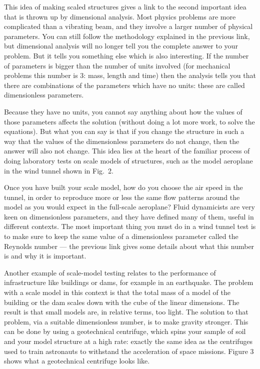   This idea of making scaled structures gives a link to the second important 
  idea that is thrown up by dimensional analysis. Most physics problems are 
  more complicated than a vibrating beam, and they involve a larger number of 
  physical parameters. You can still follow the methodology explained in the 
  previous link, but dimensional analysis will no longer tell you the complete 
  answer to your problem. But it tells you something else which is also 
  interesting. If the number of parameters is bigger than the number of units 
  involved (for mechanical problems this number is 3: mass, length and time) 
  then the analysis tells you that there are combinations of the parameters 
  which have no units: these are called dimensionless parameters. 

  Because they have no units, you cannot say anything about how the values of 
  those parameters affects the solution (without doing a lot more work, to 
  solve the equations). But what you can say is that if you change the 
  structure in such a way that the values of the dimensionless parameters do 
  not change, then the answer will also not change. This idea lies at the heart 
  of the familiar process of doing laboratory tests on scale models of 
  structures, such as the model aeroplane in the wind tunnel shown in Fig.\ 2. 


  Once you have built your scale model, how do you choose the air speed in the 
  tunnel, in order to reproduce more or less the same flow patterns around the 
  model as you would expect in the full-scale aeroplane? Fluid dynamicists are 
  very keen on dimensionless parameters, and they have defined many of them, 
  useful in different contexts. The most important thing you must do in a wind 
  tunnel test is to make sure to keep the same value of a dimensionless 
  parameter called the Reynolds number — the previous link gives some details 
  about what this number is and why it is important. 

  Another example of scale-model testing relates to the performance of 
  infrastructure like buildings or dams, for example in an earthquake. The 
  problem with a scale model in this context is that the total mass of a model 
  of the building or the dam scales down with the cube of the linear 
  dimensions. The result is that small models are, in relative terms, too 
  light. The solution to that problem, via a suitable dimensionless number, is 
  to make gravity stronger. This can be done by using a geotechnical 
  centrifuge, which spins your sample of soil and your model structure at a 
  high rate: exactly the same idea as the centrifuges used to train astronauts 
  to withstand the acceleration of space missions. Figure 3 shows what a 
  geotechnical centrifuge looks like. 

